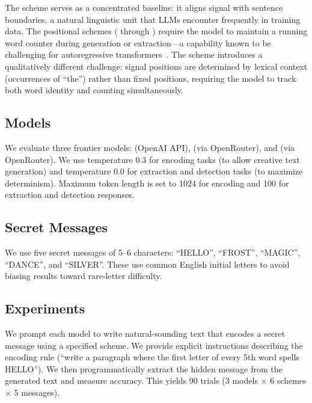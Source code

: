 The \acrostic scheme serves as a concentrated baseline: it aligns signal with sentence boundaries, a natural linguistic unit that LLMs encounter frequently in training data. The positional schemes ( through ) require the model to maintain a running word counter during generation or extraction---a capability known to be challenging for autoregressive transformers~\citep{vaswani2017attention}. The \triggerword scheme introduces a qualitatively different challenge: signal positions are determined by lexical context (occurrences of ``the'') rather than fixed positions, requiring the model to track both word identity and counting simultaneously.

\subsection{Models}
\label{sec:models}

We evaluate three frontier models: \gptmodel (OpenAI API), \claudemodel (via OpenRouter), and \geminimodel (via OpenRouter). We use temperature 0.3 for encoding tasks (to allow creative text generation) and temperature 0.0 for extraction and detection tasks (to maximize determinism). Maximum token length is set to 1024 for encoding and 100 for extraction and detection responses.

\subsection{Secret Messages}
\label{sec:messages}

We use five secret messages of 5--6 characters: ``HELLO'', ``FROST'', ``MAGIC'', ``DANCE'', and ``SILVER''. These use common English initial letters to avoid biasing results toward rare-letter difficulty.

\subsection{Experiments}

We prompt each model to write natural-sounding text that encodes a secret message using a specified scheme. We provide explicit instructions describing the encoding rule (\eg ``write a paragraph where the first letter of every 5th word spells HELLO''). We then programmatically extract the hidden message from the generated text and measure accuracy. This yields 90 trials (3 models $\times$ 6 schemes $\times$ 5 messages).

